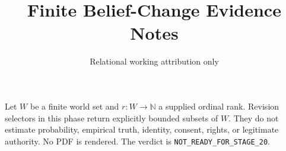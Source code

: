 \documentclass{article}
\title{Finite Belief-Change Evidence Notes}
\author{Relational working attribution only}
\begin{document}
\maketitle
Let $W$ be a finite world set and $r:W\to\mathbb{N}$ a supplied ordinal rank. Revision selectors in this phase return explicitly bounded subsets of $W$. They do not estimate probability, empirical truth, identity, consent, rights, or legitimate authority. No PDF is rendered. The verdict is \texttt{NOT\_READY\_FOR\_STAGE\_20}.
\end{document}
